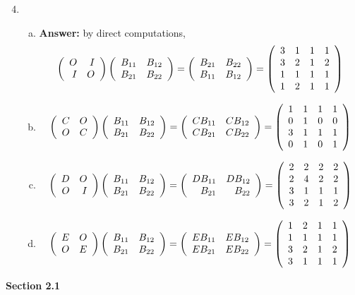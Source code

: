 \documentclass[8pt]{article} %
\begin{document}
\begin{enumerate}[1]
	\setcounter{enumi}{3}
	\item 
		\begin{enumerate}[(a)]
			\item {\bf Answer: }by direct computations,
				\[\left(\begin{array}{rr}O&I\\I&O\end{array}\right)\left(\begin{array}{rr}B_{11}&B_{12}\\B_{21}&B_{22}\end{array}\right)=
				\left(\begin{array}{rr}B_{21}&B_{22}\\B_{11}&B_{12}\end{array}\right)=
\left(\begin{array}{rrrr}
3&1&1&1\\
3&2&1&2\\
1&1&1&1\\
1&2&1&1\\
\end{array}\right)
				\]
			\item 
				\[\left(\begin{array}{rr}C&O\\O&C\end{array}\right)\left(\begin{array}{rr}B_{11}&B_{12}\\B_{21}&B_{22}\end{array}\right)=
				\left(\begin{array}{rr}CB_{11}&CB_{12}\\CB_{21}&CB_{22}\end{array}\right)=
\left(\begin{array}{rrrr}
1&1&1&1\\
0&1&0&0\\
3&1&1&1\\
0&1&0&1\\
\end{array}\right)
				\]
			\item 
				\[\left(\begin{array}{rr}D&O\\O&I\end{array}\right)\left(\begin{array}{rr}B_{11}&B_{12}\\B_{21}&B_{22}\end{array}\right)=
				\left(\begin{array}{rr}DB_{11}&DB_{12}\\B_{21}&B_{22}\end{array}\right)=
\left(\begin{array}{rrrr}2&2&2&2\\2&4&2&2\\3&1&1&1\\3&2&1&2\end{array}\right)
				\]
			\item 
				\[\left(\begin{array}{rr}E&O\\O&E\end{array}\right)\left(\begin{array}{rr}B_{11}&B_{12}\\B_{21}&B_{22}\end{array}\right)=
				\left(\begin{array}{rr}EB_{11}&EB_{12}\\EB_{21}&EB_{22}\end{array}\right)=
\left(\begin{array}{rrrr}1&2&1&1\\1&1&1&1\\3&2&1&2\\3&1&1&1\end{array}\right)
				\]
		\end{enumerate}
\end{enumerate}
\textbf{Section 2.1}
\end{document}

